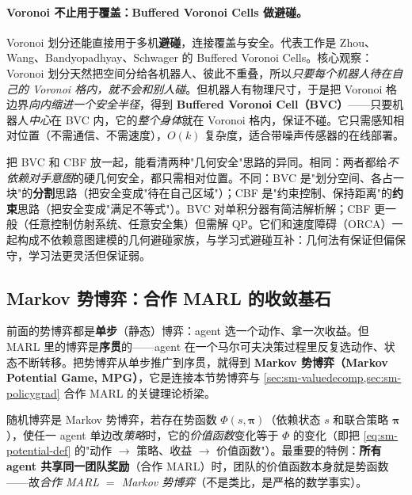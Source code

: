 \paragraph{Voronoi 不止用于覆盖：Buffered Voronoi Cells 做避碰。}
Voronoi 划分还能直接用于多机\textbf{避碰}，连接覆盖与安全。代表工作是 Zhou、Wang、Bandyopadhyay、Schwager 的 Buffered Voronoi Cells\cite{zhou2017bvc}。核心观察：Voronoi 划分天然把空间分给各机器人、彼此不重叠，所以\emph{只要每个机器人待在自己的 Voronoi 格内，就不会和别人碰}。但机器人有物理尺寸，于是把 Voronoi 格边界\emph{向内缩进一个安全半径}，得到 \textbf{Buffered Voronoi Cell（BVC）}——只要机器人\emph{中心}在 BVC 内，它的\emph{整个身体}就在 Voronoi 格内，保证不碰。它只需感知相对位置（不需通信、不需速度），$O(k)$ 复杂度，适合带噪声传感器的在线部署。

\begin{insight}
把 BVC 和 CBF 放一起，能看清两种"几何安全"思路的异同。相同：两者都给\emph{不依赖对手意图}的硬几何安全，都只需相对位置。不同：BVC 是"划分空间、各占一块"的\textbf{分割}思路（把安全变成"待在自己区域"）；CBF 是"约束控制、保持距离"的\textbf{约束}思路（把安全变成"满足不等式"）。BVC 对单积分器有简洁解析解；CBF 更一般（任意控制仿射系统、任意安全集）但需解 QP。它们和速度障碍（ORCA）一起构成不依赖意图建模的几何避碰家族，与学习式避碰互补：几何法有保证但偏保守，学习法更灵活但保证弱。
\end{insight}

\subsection{Markov 势博弈：合作 MARL 的收敛基石}
\label{sec:sm-mpg}

前面的势博弈都是\textbf{单步}（静态）博弈：agent 选一个动作、拿一次收益。但 MARL 里的博弈是\textbf{序贯}的——agent 在一个马尔可夫决策过程里反复选动作、状态不断转移。把势博弈从单步推广到序贯，就得到 \textbf{Markov 势博弈（Markov Potential Game, MPG）}，它是连接本节势博弈与 \cref{sec:sm-valuedecomp,sec:sm-policygrad} 合作 MARL 的关键理论桥梁。

\begin{definition}\label{def:sm-mpg}
随机博弈是 Markov 势博弈，若存在势函数 $\Phi(s,\boldsymbol{\pi})$（依赖状态 $s$ 和联合策略 $\boldsymbol{\pi}$），使任一 agent 单边改\emph{策略}时，它的\emph{价值函数}变化等于 $\Phi$ 的变化（即把 \cref{eq:sm-potential-def} 的"动作 $\to$ 策略、收益 $\to$ 价值函数"）。最重要的特例：\textbf{所有 agent 共享同一团队奖励}（合作 MARL）时，团队的价值函数本身就是势函数——故\emph{合作 MARL $=$ Markov 势博弈}（不是类比，是严格的数学事实）。
\end{definition}

